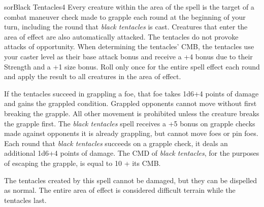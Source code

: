 \begin{spellcard}{sor}{Black Tentacles}{4}
  \newcommand{\hauntstatistics}{NULL}
  \newcommand{\ruse}{0}
  \newcommand{\draconic}{0}
  \newcommand{\meditative}{0}
  \spellcardinfo{}
  Every creature within the area of the spell is the target of a combat
  maneuver check made to grapple each round at the beginning of your turn,
  including the round that \emph{black tentacles} is cast. Creatures that
  enter the area of effect are also automatically attacked. The tentacles
  do not provoke attacks of opportunity. When determining the tentacles'
  CMB, the tentacles use your caster level as their base attack bonus and
  receive a +4 bonus due to their Strength and a +1 size bonus. Roll only
  once for the entire spell effect each round and apply the result to all
  creatures in the area of effect.

  If the tentacles succeed in grappling a foe, that foe takes 1d6+4 points
  of damage and gains the grappled condition. Grappled opponents cannot
  move without first breaking the grapple. All other movement is
  prohibited unless the creature breaks the grapple first. The \emph{black
    tentacles} spell receives a +5 bonus on grapple checks made against
  opponents it is already grappling, but cannot move foes or pin foes.
  Each round that \emph{black tentacles} succeeds on a grapple check, it
  deals an additional 1d6+4 points of damage. The CMD of \emph{black
    tentacles}, for the purposes of escaping the grapple, is equal to 10 +
  its CMB\@.

  The tentacles created by this spell cannot be damaged, but they can be
  dispelled as normal. The entire area of effect is considered difficult
  terrain while the tentacles last.

\end{spellcard}
